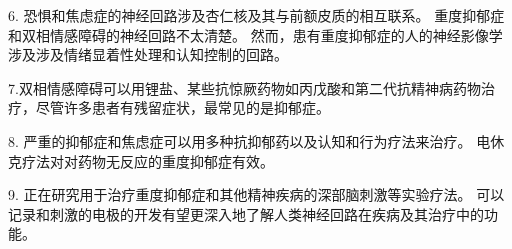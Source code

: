 6. 恐惧和焦虑症的神经回路涉及杏仁核及其与前额皮质的相互联系。 重度抑郁症和双相情感障碍的神经回路不太清楚。 然而，患有重度抑郁症的人的神经影像学涉及涉及情绪显着性处理和认知控制的回路。 

7.双相情感障碍可以用锂盐、某些抗惊厥药物如丙戊酸和第二代抗精神病药物治疗，尽管许多患者有残留症状，最常见的是抑郁症。

8. 严重的抑郁症和焦虑症可以用多种抗抑郁药以及认知和行为疗法来治疗。 电休克疗法对对药物无反应的重度抑郁症有效。 

9. 正在研究用于治疗重度抑郁症和其他精神疾病的深部脑刺激等实验疗法。 可以记录和刺激的电极的开发有望更深入地了解人类神经回路在疾病及其治疗中的功能。




